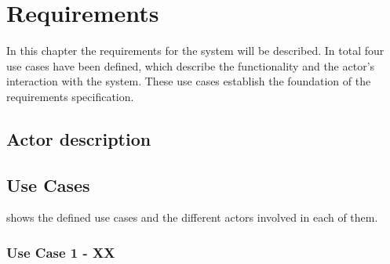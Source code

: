 
\chapter{Requirements}

In this chapter the requirements for the system will be described.
In total four use cases have been defined, which describe the functionality and the actor's interaction with the \systemName system. These use cases establish the foundation of the requirements specification.


\section{Actor description}

\section{Use Cases}
\label{rap:UC}
 shows the defined use cases and the different actors involved in each of them.


\subsection{Use Case 1 - XX}

